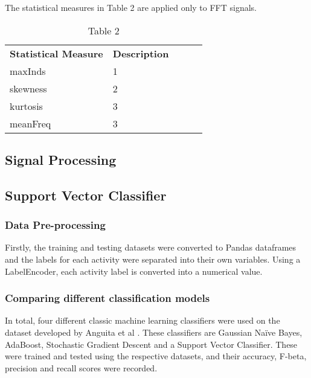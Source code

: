    The statistical measures in Table 2 are applied only to FFT signals.

    \begin{table}[ht]
        \begin{tabular}{|l|l|lll}
            \cline{1-2}
            \textbf{Statistical Measure} & \textbf{Description} &  &  &  \\ \cline{1-2}
            maxInds             & 1           &  &  &  \\ \cline{1-2}
            skewness            & 2           &  &  &  \\ \cline{1-2}
            kurtosis               & 3           &  &  &  \\ \cline{1-2}
            meanFreq            & 3           &  &  &  \\ \cline{1-2}
        \end{tabular}
        \caption*{Table 2}
    \end{table}


\subsection{Signal Processing}

\subsection{Support Vector Classifier}
    \subsubsection{Data Pre-processing}
        Firstly, the training and testing datasets were converted to Pandas dataframes and the labels for each activity were separated into their own variables.
        Using a LabelEncoder, each activity label is converted into a numerical value.

    \subsubsection{Comparing different classification models}
        In total, four different classic machine learning classifiers were used on the dataset developed by Anguita et al \cite{Anguita2012}. These classifiers are Gaussian Naïve Bayes,
        AdaBoost, Stochastic Gradient Descent and a Support Vector Classifier. These were trained and tested using the respective datasets, and their accuracy,
        F-beta, precision and recall scores were recorded.

